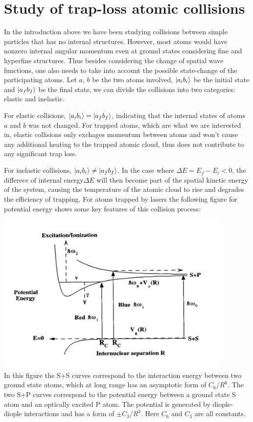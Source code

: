 \documentclass{article}
\begin{document}
\section{Study of trap-loss atomic collisions}
In the introduction above we have been studying collisions between simple particles that has no internal structures. However, most atoms would have nonzero internal angular momentum even at ground states considering fine and hyperfine structures. Thus besides considering the change of spatial wave functions, one also needs to take into account the possible state-change of the participating atoms. Let $a$, $b$ be the two atoms involved, $\ket{a_ib_i}$ be the initial state and $\ket{a_fb_f}$ be the final state, we can divide the collisions into two categories: elastic and inelastic. 

For elastic collisions, $\ket{a_ib_i}=\ket{a_fb_f}$, indicating that the internal states of atoms $a$ and $b$ was not changed. For trapped atoms, which are what we are interested in, elastic collisions only exchages momentum between atoms and won't cause any additional heating to the trapped atomic cloud, thus does not contribute to any significant trap loss. 

For inelastic collisions, $\ket{a_ib_i}\neq\ket{a_fb_f}$. In the case where $\Delta{E}=E_f-E_i<0$, the differece of internal energy$\Delta{E}$ will then become part of the spatial kinetic energy of the system, causing the temperature of the atomic cloud to rise and degrades the efficiency of trapping. For atoms trapped by lasers the following figure for potential energy shows some key features of this collision process:

\includegraphics[height=3in]{collisions.JPG}

In this figure the S+S curves correspond to the interaction energy between two ground state atoms, which at long range has an asymptotic form of ${C_6}/{R^6}$. The two S+P curves correspond to the potential energy between a ground state S atom and an optically excited P atom. The potential is generated by diople-diople interactions and has a form of $\pm{C_3}/{R^3}$. Here $C_6$ and $C_3$ are all constants. 
\end{document}
